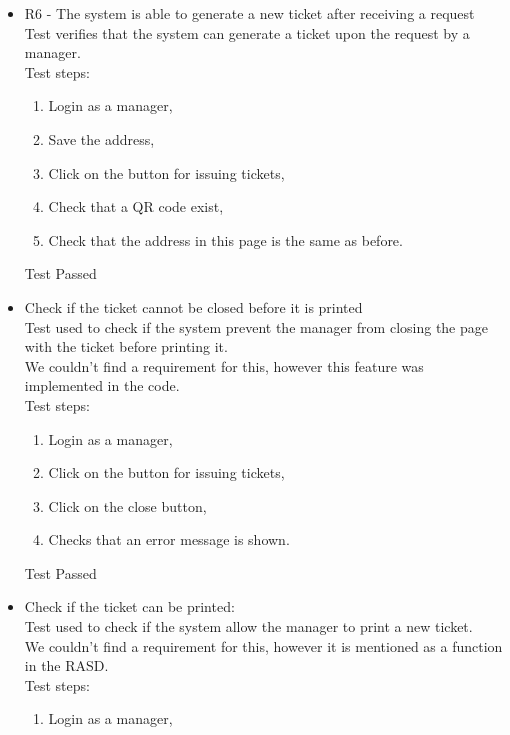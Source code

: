 \begin{itemize}
    \item R6 - The system is able to generate a new ticket after receiving a request\\
    Test verifies that the system can generate a ticket upon the request by a manager. \\
    Test steps: \\
    \begin{enumerate}

        \item Login as a manager,

        \item Save the address,

        \item Click on the button for issuing tickets,

        \item Check that a QR code exist,

        \item Check that the address in this page is the same as before.
    \end{enumerate}
    Test Passed

    \item Check if the ticket cannot be closed before it is printed\\
    Test used to check if the system prevent the manager from closing the page with the ticket before printing it. \\
    We couldn't find a requirement for this, however this feature was implemented in the code. \\
    Test steps: \\
    \begin{enumerate}
        \item Login as a manager,

        \item Click on the button for issuing tickets,

        \item Click on the close button,

        \item Checks that an error message is shown.
    \end{enumerate}
    Test Passed \\

    \item Check if the ticket can be printed: \\
    Test used to check if the system allow the manager to print a new ticket. \\
    We couldn't find a requirement for this, however it is mentioned as a function in the RASD. \\
    Test steps:\\
    \begin{enumerate}
        \item Login as a manager,


\end{enumerate}
\end{itemize}
